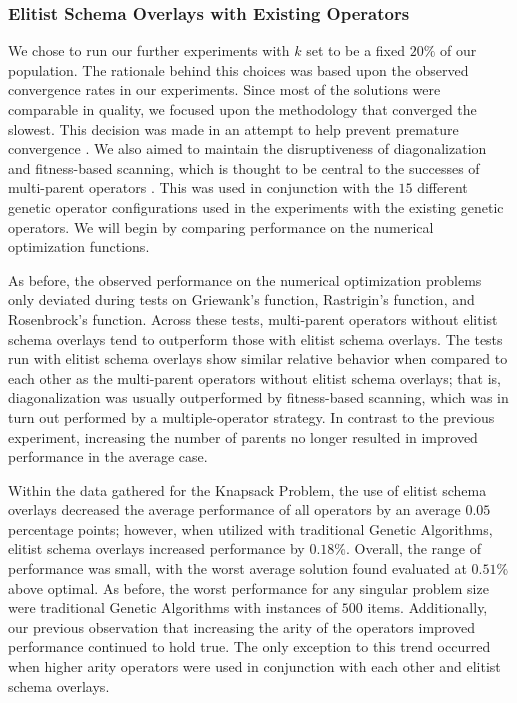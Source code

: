 \subsubsection*{Elitist Schema Overlays with Existing Operators}
We chose to run our further experiments with $k$ set to be a fixed $20\%$ of our population. The rationale behind this choices was based upon the observed convergence rates in our experiments. Since most of the solutions were comparable in quality, we focused upon the methodology that converged the slowest. This decision was made in an attempt to help prevent premature convergence \cite{Andre01}. We also aimed to maintain the disruptiveness of diagonalization and fitness-based scanning, which is thought to be central to the successes of multi-parent operators \cite{Eiben95}. This was used in conjunction with the $15$ different genetic operator configurations used in the experiments with the existing genetic operators. We will begin by comparing performance on the numerical optimization functions.

%
%

As before, the observed performance on the numerical optimization problems only deviated during tests on Griewank's function, Rastrigin's function, and Rosenbrock's function. Across these tests, multi-parent operators without elitist schema overlays tend to outperform those with elitist schema overlays. The tests run with elitist schema overlays show similar relative behavior when compared to each other as the multi-parent operators without elitist schema overlays; that is, diagonalization was usually outperformed by fitness-based scanning, which was in turn out performed by a multiple-operator strategy. In contrast to the previous experiment, increasing the number of parents no longer resulted in improved performance in the average case.

%
%

Within the data gathered for the Knapsack Problem, the use of elitist schema overlays decreased the average performance of all operators by an average $0.05$ percentage points; however, when utilized with traditional Genetic Algorithms, elitist schema overlays increased performance by $0.18\%$. Overall, the range of performance was small, with the worst average solution found evaluated at $0.51\%$ above optimal. As before, the worst performance for any singular problem size were traditional Genetic Algorithms with instances of $500$ items. Additionally, our previous observation that increasing the arity of the operators improved performance continued to hold true. The only exception to this trend occurred when higher arity operators were used in conjunction with each other and elitist schema overlays.

